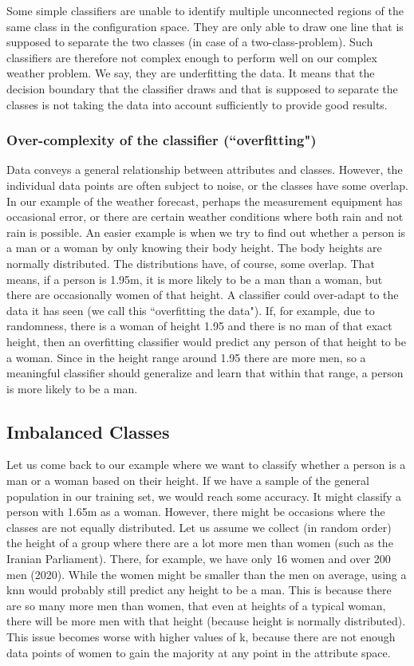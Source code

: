 \documentclass[10pt,a4paper]{article}
\begin{document}
Some simple classifiers are unable to identify multiple unconnected regions of the same class in the configuration space. They are only able to draw one line that is supposed to separate the two classes (in case of a two-class-problem). Such classifiers are therefore not complex enough to perform well on our complex weather problem. We say, they are underfitting the data. It means that the decision boundary that the classifier draws and that is supposed to separate the classes is not taking the data into account sufficiently to provide good results.

\subsubsection{Over-complexity of the classifier (``overfitting")}
Data conveys a general relationship between attributes and classes. However, the individual data points are often subject to noise, or the classes have some overlap. In our example of the weather forecast, perhaps the measurement equipment has occasional error, or there are certain weather conditions where both rain and not rain is possible. An easier example is when we try to find out whether a person is a man or a woman by only knowing their body height. The body heights are normally distributed. The distributions have, of course, some overlap. That means, if a person is 1.95m, it is more likely to be a man than a woman, but there are occasionally women of that height.  A classifier could over-adapt to the data it has seen (we call this ``overfitting the data"). If, for example, due to randomness, there is a woman of height 1.95 and there is no man of that exact height, then an overfitting classifier would predict any person of that height to be a woman. Since in the height range around 1.95 there are more men, so a meaningful classifier should generalize and learn that within that range, a person is more likely to be a man.

\subsection{Imbalanced Classes}
Let us come back to our example where we want to classify whether a person is a man or a woman based on their height. If we have a sample of the general population in our training set, we would reach some accuracy. It might classify a person with 1.65m as a woman. However, there might be occasions where the classes are not equally distributed. Let us assume we collect (in random order) the height of a group where there are a lot more men than women (such as the Iranian Parliament). There, for example, we have only 16 women and over 200 men (2020). While the women might be smaller than the men on average, using a knn would probably still predict any height to be a man. This is because there are so many more men than women, that even at heights of a typical woman, there will be more men with that height (because height is normally distributed). This issue becomes worse with higher values of k, because there are not enough data points of women to gain the majority at any point in the attribute space.
\end{document}
